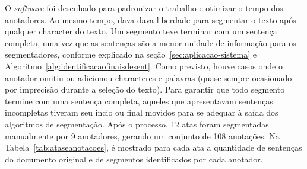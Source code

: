 O \textit{software} foi desenhado para padronizar o trabalho e otimizar o tempo dos anotadores. Ao mesmo tempo, dava dava liberdade para segmentar o texto após qualquer character do texto. Um segmento teve terminar com um sentença completa, uma vez que as sentenças são a menor unidade de informação para os segmentadores, conforme explicado na seção~\ref{sec:aplicacao-sistema} e Algoritmo~\ref{alg:identificacaofinaisdesent}. Como previsto, houve casos onde o anotador omitiu ou adicionou characteres e palavras (quase sempre ocasionado por imprecisão durante a seleção do texto). Para garantir que todo segmento termine com uma sentença completa, aqueles que apresentavam sentenças incompletas tiveram seu incio ou final movidos para se adequar à saída dos algoritmos de segmentação. Após o processo, 12 atas foram segmentadas manualmente por 9 anotadores, gerando um conjunto de 108 anotações. Na Tabela~\ref{tab:ataseanotacoes}, é mostrado para cada ata a quantidade de sentenças do documento original e de segmentos identificados por cada anotador.



